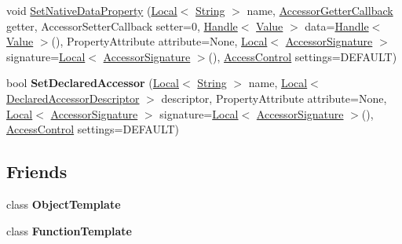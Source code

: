 \begin{DoxyCompactItemize}
\item 
void \hyperlink{classv8_1_1Template_ae186b9e472ed7604cc9693c7b9540909}{Set\-Native\-Data\-Property} (\hyperlink{classv8_1_1Local}{Local}$<$ \hyperlink{classv8_1_1String}{String} $>$ name, \hyperlink{namespacev8_a2676a71943fdebd2e0a09fc256de6ff9}{Accessor\-Getter\-Callback} getter, Accessor\-Setter\-Callback setter=0, \hyperlink{classv8_1_1Handle}{Handle}$<$ \hyperlink{classv8_1_1Value}{Value} $>$ data=\hyperlink{classv8_1_1Handle}{Handle}$<$ \hyperlink{classv8_1_1Value}{Value} $>$(), Property\-Attribute attribute=None, \hyperlink{classv8_1_1Local}{Local}$<$ \hyperlink{classv8_1_1AccessorSignature}{Accessor\-Signature} $>$ signature=\hyperlink{classv8_1_1Local}{Local}$<$ \hyperlink{classv8_1_1AccessorSignature}{Accessor\-Signature} $>$(), \hyperlink{namespacev8_a31d8355cb043d7d2dda3f4a52760b64e}{Access\-Control} settings=D\-E\-F\-A\-U\-L\-T)
\item 
\hypertarget{classv8_1_1Template_a82a06b2a76a32883f2f756a919b2dee8}{bool {\bfseries Set\-Declared\-Accessor} (\hyperlink{classv8_1_1Local}{Local}$<$ \hyperlink{classv8_1_1String}{String} $>$ name, \hyperlink{classv8_1_1Local}{Local}$<$ \hyperlink{classv8_1_1DeclaredAccessorDescriptor}{Declared\-Accessor\-Descriptor} $>$ descriptor, Property\-Attribute attribute=None, \hyperlink{classv8_1_1Local}{Local}$<$ \hyperlink{classv8_1_1AccessorSignature}{Accessor\-Signature} $>$ signature=\hyperlink{classv8_1_1Local}{Local}$<$ \hyperlink{classv8_1_1AccessorSignature}{Accessor\-Signature} $>$(), \hyperlink{namespacev8_a31d8355cb043d7d2dda3f4a52760b64e}{Access\-Control} settings=D\-E\-F\-A\-U\-L\-T)}\label{classv8_1_1Template_a82a06b2a76a32883f2f756a919b2dee8}

\end{DoxyCompactItemize}
\subsection*{Friends}
\begin{DoxyCompactItemize}
\item 
\hypertarget{classv8_1_1Template_a4d28646409234f556983be8a96c06424}{class {\bfseries Object\-Template}}\label{classv8_1_1Template_a4d28646409234f556983be8a96c06424}

\item 
\hypertarget{classv8_1_1Template_a334168ad1a5f39cf17b818ca3356aacd}{class {\bfseries Function\-Template}}\label{classv8_1_1Template_a334168ad1a5f39cf17b818ca3356aacd}

\end{DoxyCompactItemize}


